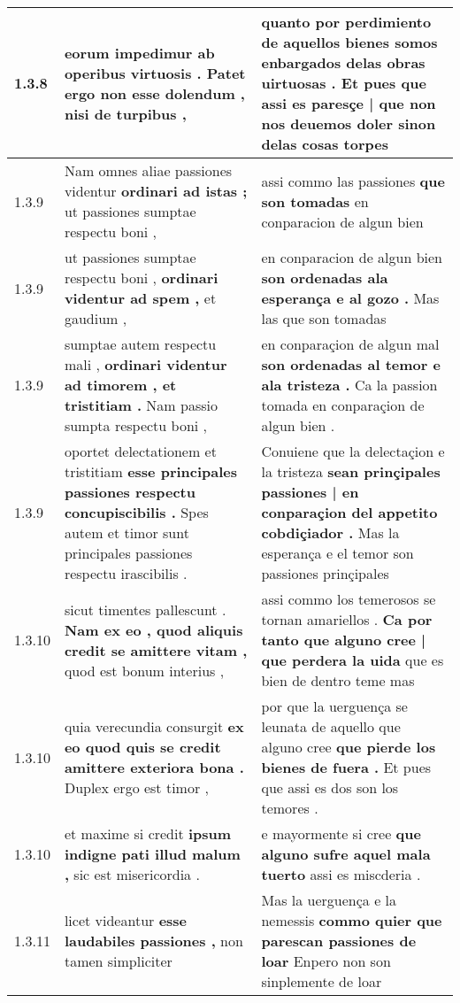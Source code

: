 \begin{tabular}{|p{1cm}|p{6.5cm}|p{6.5cm}|}
1.3.8 & eorum impedimur \textbf{ ab operibus virtuosis . Patet ergo non esse dolendum , } nisi de turpibus , & quanto por perdimiento de aquellos bienes somos enbargados delas obras uirtuosas . \textbf{ Et pues que assi es paresçe | que non nos deuemos doler } sinon delas cosas torpes \\\hline
1.3.9 & Nam omnes aliae passiones videntur \textbf{ ordinari ad istas ; } ut passiones sumptae respectu boni , & assi commo las passiones \textbf{ que son tomadas } en conparacion de algun bien \\\hline
1.3.9 & ut passiones sumptae respectu boni , \textbf{ ordinari videntur ad spem , } et gaudium , & en conparacion de algun bien \textbf{ son ordenadas ala esperança e al gozo . } Mas las que son tomadas \\\hline
1.3.9 & sumptae autem respectu mali , \textbf{ ordinari videntur ad timorem , et tristitiam . } Nam passio sumpta respectu boni , & en conparaçion de algun mal \textbf{ son ordenadas al temor e ala tristeza . } Ca la passion tomada en conparaçion de algun bien . \\\hline
1.3.9 & oportet delectationem et tristitiam \textbf{ esse principales passiones respectu concupiscibilis . } Spes autem et timor sunt principales passiones respectu irascibilis . & Conuiene que la delectaçion e la tristeza \textbf{ sean prinçipales passiones | en conparaçion del appetito cobdiçiador . } Mas la esperança e el temor son passiones prinçipales \\\hline
1.3.10 & sicut timentes pallescunt . \textbf{ Nam ex eo , quod aliquis credit se amittere vitam , } quod est bonum interius , & assi commo los temerosos se tornan amariellos . \textbf{ Ca por tanto que alguno cree | que perdera la uida } que es bien de dentro teme mas \\\hline
1.3.10 & quia verecundia consurgit \textbf{ ex eo quod quis se credit amittere exteriora bona . } Duplex ergo est timor , & por que la uerguença se leunata de aquello que alguno cree \textbf{ que pierde los bienes de fuera . } Et pues que assi es dos son los temores . \\\hline
1.3.10 & et maxime si credit \textbf{ ipsum indigne pati illud malum , } sic est misericordia . & e mayormente si cree \textbf{ que alguno sufre aquel mala tuerto } assi es miscderia . \\\hline
1.3.11 & licet videantur \textbf{ esse laudabiles passiones , } non tamen simpliciter & Mas la uerguença e la nemessis \textbf{ commo quier que parescan passiones de loar } Enpero non son sinplemente de loar \\\hline

\end{tabular}
